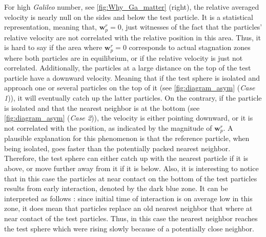 

For high \textit{Galileo} number, see \ref{fig:Why_Ga_matter} (right), the relative averaged velocity is nearly null on the sides and below the test particle. 
It is a statistical representation, meaning that, $\textbf{w}_p^r = 0$, just witnesses of the fact that the particles' relative velocity are not correlated with the relative position in this area. 
Thus, it is hard to say if the area where $\textbf{w}_p^r = 0$ corresponds to actual stagnation zones where both particles are in equilibrium, or if the relative velocity is just not correlated. 
Additionally, the particles at a large distance on the top of the test particle have a downward velocity. 
Meaning that if the test sphere is isolated and approach one or several  particles on the top of it (see \ref{fig:diagram_asym} (\textit{Case 1})), it will eventually catch up the latter particles. 
On the contrary, if the particle is isolated and that the nearest neighbor is at the bottom (see \ref{fig:diagram_asym} (\textit{Case 2})), the velocity is either pointing downward, or it is not correlated with the position, as indicated by the magnitude of $\textbf{w}_p^r$. 
A plausible explanation for this phenomenon is that the reference particle, when being isolated, goes faster than the potentially packed nearest neighbor.
Therefore, the test sphere can either catch up with the nearest particle if it is above, or move further away from it if it is below.
Also, it is interesting to notice that in this case the particles at near contact on the bottom of the test particles results from early interaction, denoted by the dark blue zone. 
It can be interpreted as follows : since 
initial time of interaction is on average low in this zone, it does mean that particles replace an old nearest neighbor that where at near contact of the test particles. 
Thus, in this case the nearest neighbor reaches the test sphere which were rising slowly because of a potentially close neighbor. 

